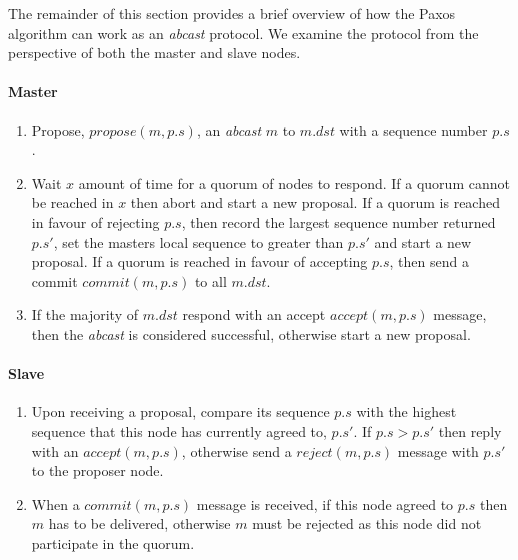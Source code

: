 		The remainder of this section provides a brief overview of how the Paxos algorithm can work as an \emph{abcast} protocol.  We examine the protocol from the perspective of both the master and slave nodes.  
		
		\paragraph{Master} \hspace{0pt}
		\begin{enumerate}
  			\item Propose, $propose(m, p.s)$, an \emph{abcast} $m$ to $m.dst$ with a sequence number $p.s$.
  			\item Wait $x$ amount of time for a quorum of nodes to respond.  If a quorum cannot be reached in $x$ then abort and start a new proposal.  If a quorum is reached in favour of rejecting $p.s$, then record the largest sequence number returned $p.s'$, set the masters local sequence to greater than $p.s'$ and start a new proposal.  If a quorum is reached in favour of accepting $p.s$, then send a commit $commit(m, p.s)$ to all $m.dst$.  
  			\item If the majority of $m.dst$ respond with an accept $accept(m, p.s)$ message, then the \emph{abcast} is considered successful, otherwise start a new proposal.  
		\end{enumerate}
		
		\paragraph{Slave} \hspace{0pt}
		\begin{enumerate}
  			\item Upon receiving a proposal, compare its sequence $p.s$ with the highest sequence that this node has currently agreed to, $p.s'$.  If $p.s > p.s'$ then reply with an $accept(m, p.s)$, otherwise send a $reject(m, p.s)$ message with $p.s'$ to the proposer node.  
  			\item When a $commit(m, p.s)$ message is received, if this node agreed to $p.s$ then $m$ has to be delivered, otherwise $m$ must be rejected as this node did not participate in the quorum.  
		\end{enumerate}		
	

